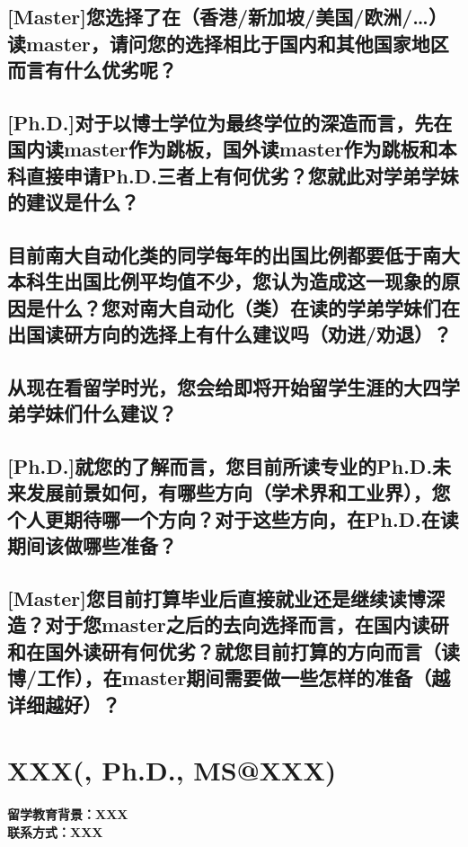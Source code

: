 \documentclass[a4paper,UTF8]{book}
\begin{document}
\subsection*{[Master]您选择了在（香港/新加坡/美国/欧洲/…）读master，请问您的选择相比于国内和其他国家地区而言有什么优劣呢？}

\subsection*{[Ph.D.]对于以博士学位为最终学位的深造而言，先在国内读master作为跳板，国外读master作为跳板和本科直接申请Ph.D.三者上有何优劣？您就此对学弟学妹的建议是什么？}

\subsection*{目前南大自动化类的同学每年的出国比例都要低于南大本科生出国比例平均值不少，您认为造成这一现象的原因是什么？您对南大自动化（类）在读的学弟学妹们在出国读研方向的选择上有什么建议吗（劝进/劝退）？}

\subsection*{从现在看留学时光，您会给即将开始留学生涯的大四学弟学妹们什么建议？}

\subsection*{[Ph.D.]就您的了解而言，您目前所读专业的Ph.D.未来发展前景如何，有哪些方向（学术界和工业界），您个人更期待哪一个方向？对于这些方向，在Ph.D.在读期间该做哪些准备？}

\subsection*{[Master]您目前打算毕业后直接就业还是继续读博深造？对于您master之后的去向选择而言，在国内读研和在国外读研有何优劣？就您目前打算的方向而言（读博/工作），在master期间需要做一些怎样的准备（越详细越好）？}

\newpage
\section{XXX(, Ph.D., MS@XXX)}
\paragraph{留学教育背景：XXX\\联系方式：XXX}
\end{document}
